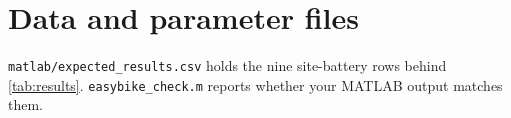 \section{Data and parameter files}
\texttt{matlab/expected\_results.csv} holds the nine site-battery rows behind \cref{tab:results}. \texttt{easybike\_check.m} reports whether your MATLAB output matches them.
